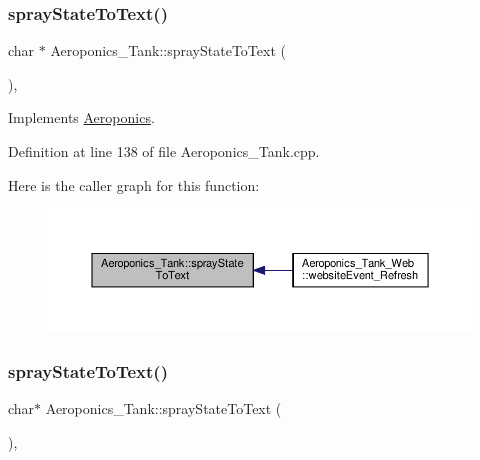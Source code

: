 \subsubsection{\texorpdfstring{spray\+State\+To\+Text()}{sprayStateToText()}\hspace{0.1cm}{\footnotesize\ttfamily [1/2]}}
{\footnotesize\ttfamily char $\ast$ Aeroponics\+\_\+\+Tank\+::spray\+State\+To\+Text (\begin{DoxyParamCaption}{ }\end{DoxyParamCaption})\hspace{0.3cm}{\ttfamily [protected]}, {\ttfamily [virtual]}}



Implements \hyperlink{class_aeroponics_aa79435aaa49a563d41ae092ec3e87e06}{Aeroponics}.



Definition at line 138 of file Aeroponics\+\_\+\+Tank.\+cpp.

Here is the caller graph for this function\+:
\nopagebreak
\begin{figure}[H]
\begin{center}
\leavevmode
\includegraphics[width=350pt]{class_aeroponics___tank_a0c9c9616ee380d0e4dd0ccc41d7e7a0f_icgraph}
\end{center}
\end{figure}
\mbox{\label{class_aeroponics___tank_a822daf2443f3326cc4ba1ab1ba0c02f2}} 
\subsubsection{\texorpdfstring{spray\+State\+To\+Text()}{sprayStateToText()}\hspace{0.1cm}{\footnotesize\ttfamily [2/2]}}
{\footnotesize\ttfamily char$\ast$ Aeroponics\+\_\+\+Tank\+::spray\+State\+To\+Text (\begin{DoxyParamCaption}{ }\end{DoxyParamCaption})\hspace{0.3cm}{\ttfamily [protected]}, {\ttfamily [virtual]}}



